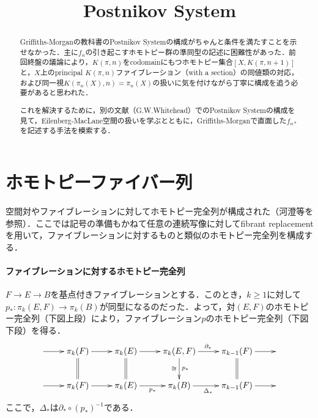 \documentclass[a4paper,11pt]{jsarticle}
\theoremstyle{definition}
\begin{document}
\date{}
\title{Postnikov System}

\maketitle

\begin{abstract}
  Griffiths-Morganの教科書のPostnikov Systemの構成がちゃんと条件を満たすことを示せなかった．主に$f_n$の引き起こすホモトピー群の準同型の記述に困難性があった．前回終盤の議論により，$K(\pi,n)$をcodomainにもつホモトピー集合$[X,K(\pi,n+1)]$と，$X$上のprincipal $K(\pi,n)$ファイブレーション（with a section）の同値類の対応，および同一視$K(\pi_n(X),n)=\pi_n(X)$の扱いに気を付けながら丁寧に構成を追う必要があると思われた．

  これを解決するために，別の文献（G.W.Whitehead）でのPostnikov Systemの構成を見て，Eilenberg-MacLane空間の扱いを学ぶとともに，Griffiths-Morganで直面した$f_{n*}$を記述する手法を模索する．
\end{abstract}

\tableofcontents

\section{ホモトピーファイバー列}
空間対やファイブレーションに対してホモトピー完全列が構成された（河澄等を参照）．ここでは記号の準備もかねて任意の連続写像に対してfibrant replacementを用いて，ファイブレーションに対するものと類似のホモトピー完全列を構成する．
\paragraph{ファイブレーションに対するホモトピー完全列}
$F\rightarrow E\rightarrow B$を基点付きファイブレーションとする．このとき，$k\ge 1$に対して$p_*\colon \pi_k(E,F)\to \pi_k(B)$が同型になるのだった．よって，対$(E,F)$のホモトピー完全列（下図上段）により，ファイブレーション$p$のホモトピー完全列（下図下段）を得る．
\[\xymatrix{
  \ar[r]&
  \pi_k(F)\ar@{=}[d]\ar[r] &
  \pi_k(E)\ar@{=}[d]\ar[r] &
  \pi_k(E,F)\ar[d]_{\cong}^{p_*}\ar[r]^{\partial_*} &
  \pi_{k-1}(F)\ar@{=}[d]\ar[r]&
  \\
  \ar[r]&
  \pi_k(F)\ar[r] &
  \pi_k(E)\ar[r]_{p_*} &
  \pi_k(B)\ar[r]_{\Delta_*} &
  \pi_{k-1}(F)\ar[r]&
}\]
ここで，$\Delta_*$は$\partial_*\circ (p_*)^{-1}$である．
\end{document}
